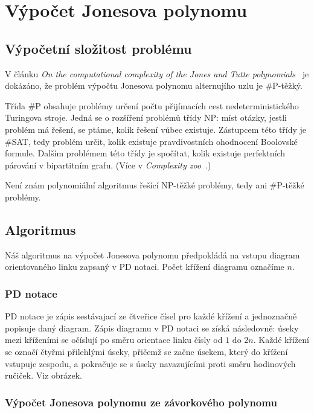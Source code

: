 \chapter{Výpočet Jonesova polynomu}


\section{Výpočetní složitost problému} 

V článku \emph{On the computational complexity of the Jones and Tutte polynomials}~\cite{jaeger_vertigan_welsh_1990} je dokázáno, že problém výpočtu Jonesova polynomu alternujího uzlu je \#P-těžký. 

Třída \#P obsahuje problémy určení počtu přijímacích cest nedeterministického Turingova stroje. Jedná se o rozšíření problémů třídy NP: míst otázky, jestli problém má řešení, se ptáme, kolik řešení vůbec existuje. Zástupcem této třídy je \#SAT, tedy problém určit, kolik existuje pravdivostních ohodnocení Boolovské formule. Dalším problémem této třídy je spočítat, kolik  existuje perfektních párování v bipartitním grafu. (Více v \emph{Complexity zoo}~\cite{zoo}.)

Není znám polynomiální algoritmus řešící NP-těžké problémy, tedy ani \#P-těžké problémy.

\section{Algoritmus}
Náš algoritmus na výpočet Jonesova polynomu předpokládá na vstupu diagram orientovaného linku zapsaný v PD notaci. Počet křížení diagramu označíme $n$.

\subsection{PD notace} 

PD notace je zápis sestávajací ze čtveřice čísel pro každé křížení a jednoznačně popisuje daný diagram. Zápis diagramu v PD notaci se získá následovně: úseky mezi kříženími se očíslují po směru orientace linku čísly od $1$ do $2 n$. Každé křížení se označí čtyřmi přilehlými úseky, přičemž se začne úsekem, který do křížení vstupuje zespodu, a pokračuje se s úseky navazujícími proti směru hodinových ručiček. Viz obrázek.

\subsection{Výpočet Jonesova polynomu ze závorkového polynomu}

